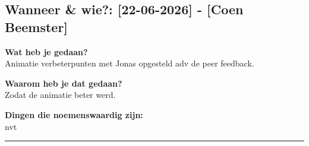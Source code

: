 
\subsection*{Wanneer \& wie?: [22-06-2026] - [Coen Beemster]}

\textbf{Wat heb je gedaan?}\\
Animatie verbeterpunten met Jonas opgesteld adv de peer feedback.
\vspace{0.3cm} 

\noindent \textbf{Waarom heb je dat gedaan?}\\
Zodat de animatie beter werd.

\noindent \textbf{Dingen die noemenswaardig zijn:}\\
nvt


\vspace{0.5cm}
\hrule 
\vspace{0.5cm}
